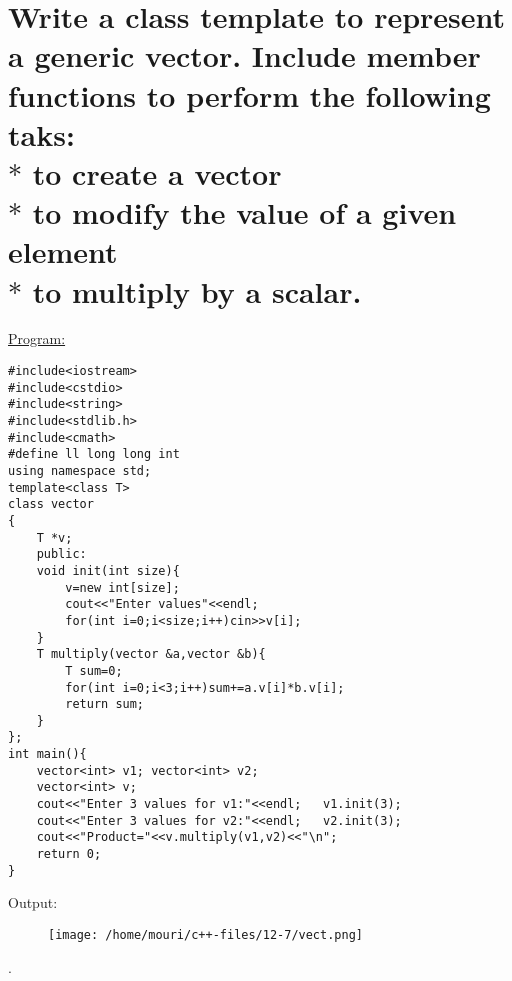 \documentclass[a4paper,11pt]{article}
\begin{document}
\section{Write a class template to represent a generic vector. Include member functions to perform the following taks:\\$*$ to create a vector\\$*$ to modify the value of a given element\\$*$ to multiply by a scalar.}
\underline{Program:}
\begin{lstlisting}[showstringspaces=false]
#include<iostream>
#include<cstdio>
#include<string>
#include<stdlib.h>
#include<cmath>
#define ll long long int
using namespace std;
template<class T>
class vector
{
    T *v;
    public:
	void init(int size){
	    v=new int[size];
	    cout<<"Enter values"<<endl;
	    for(int i=0;i<size;i++)cin>>v[i];
	}
	T multiply(vector &a,vector &b){
	    T sum=0;
	    for(int i=0;i<3;i++)sum+=a.v[i]*b.v[i];
	    return sum;
	}
};
int main(){
    vector<int> v1;	vector<int> v2;
    vector<int> v;
    cout<<"Enter 3 values for v1:"<<endl;	v1.init(3);
    cout<<"Enter 3 values for v2:"<<endl;	v2.init(3);
    cout<<"Product="<<v.multiply(v1,v2)<<"\n";
    return 0;
}
\end{lstlisting}
Output:
\begin{figure}[H]
\centering
\texttt{[image: /home/mouri/c++-files/12-7/vect.png]}
\end{figure}
.
\end{document}
